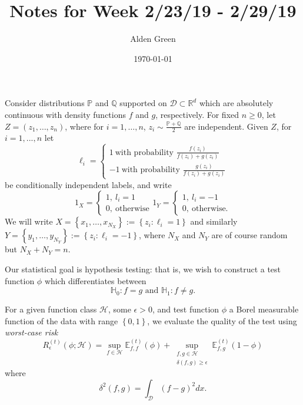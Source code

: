 \documentclass{article}
\newcommand{\Reals}{\mathbb{R}}
\newcommand{\set}[1]{\left\{#1\right\}}
\newcommand{\1}{\mathbb{I}}
\newcommand{\D}{\mathcal{D}}
\newcommand{\X}{X} %
\newcommand{\Y}{Y} %
\newcommand{\Z}{Z} %
\newcommand{\Hclass}{\mathcal{H}}
\newcommand{\Pbb}{\mathbb{P}}
\newcommand{\Ebb}{\mathbb{E}}
\newcommand{\Qbb}{\mathbb{Q}}
\theoremstyle{alden}
\theoremstyle{aldenthm}
\theoremstyle{definition}
\theoremstyle{remark}
\begin{document}
\title{Notes for Week 2/23/19 - 2/29/19}
\author{Alden Green}
\date{\today}
\maketitle

Consider distributions $\Pbb$ and $\Qbb$ supported on $\D \subset \Reals^d$ which are absolutely continuous with density functions $f$ and $g$, respectively. For fixed $n \geq 0$, let $\Z = (z_1, \ldots,z_n)$, where for $i = 1,\ldots,n$, $z_i \sim \frac{\Pbb + \Qbb}{2}$ are independent. Given $\Z$, for $i = 1,...,n$ let
\begin{equation*}
\ell_i = 
\begin{cases}
1~ \text{with probability $\frac{f(z_i)}{f(z_i) + g(z_i)}$} \\
-1~ \text{with probability $\frac{g(z_i)}{f(z_i) + g(z_i)}$}
\end{cases}
\end{equation*} 
be conditionally independent labels, and write
\begin{equation*}
1_X = 
\begin{cases}
1,~ l_i = 1\\
0,~ \text{otherwise}
\end{cases}
1_Y = 
\begin{cases}
1,~ l_i = -1 \\
0,~ \text{otherwise.}
\end{cases}
\end{equation*}
We will write $\X = \set{x_1, \ldots,x_{N_X}} := \set{z_i: \ell_i = 1}$ and similarly $\Y = \set{y_1, \ldots,y_{N_Y}} := \set{z_i: \ell_i = -1}$, where $N_X$ and $N_Y$ are of course random but $N_X + N_Y = n$. 

Our statistical goal is hypothesis testing: that is, we wish to construct a test function $\phi$ which differentiates between
\begin{equation*}
\mathbb{H}_0: f = g \text{ and } \mathbb{H}_1: f \neq g.
\end{equation*}

For a given function class $\Hclass$, some $\epsilon > 0$, and test function $\phi$ a Borel measurable function of the data with range $\set{0,1}$, we evaluate the quality of the test using \emph{worst-case risk}
\begin{equation*}
R_{\epsilon}^{(t)}(\phi; \Hclass) = \sup_{f \in \Hclass} \Ebb_{f,f}^{(t)}(\phi) + \sup_{ \substack{f,g \in \Hclass \\ \delta(f,g) \geq \epsilon } } \Ebb_{f,g}^{(t)}(1 - \phi)
\end{equation*} 
where 
\begin{equation*}
\delta^2(f,g) = \int_{\D} (f - g)^2 dx.
\end{equation*}
\end{document}
